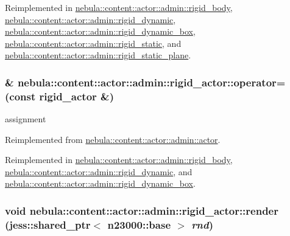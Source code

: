 Reimplemented in \hyperlink{classnebula_1_1content_1_1actor_1_1admin_1_1rigid__body_a549b82effcb63341aa4057712446ce22}{nebula::content::actor::admin::rigid\_\-body}, \hyperlink{classnebula_1_1content_1_1actor_1_1admin_1_1rigid__dynamic_af30bd690cfa2d1a98b1458c658dc97d6}{nebula::content::actor::admin::rigid\_\-dynamic}, \hyperlink{classnebula_1_1content_1_1actor_1_1admin_1_1rigid__dynamic__box_a3d03f28e3ba455be0f39ad66e00c02c9}{nebula::content::actor::admin::rigid\_\-dynamic\_\-box}, \hyperlink{classnebula_1_1content_1_1actor_1_1admin_1_1rigid__static_a12aee11a228e35bd7a8b36ff411387a8}{nebula::content::actor::admin::rigid\_\-static}, and \hyperlink{classnebula_1_1content_1_1actor_1_1admin_1_1rigid__static__plane_a5334403f326a185523ef2c7c380ffa8f}{nebula::content::actor::admin::rigid\_\-static\_\-plane}.\hypertarget{classnebula_1_1content_1_1actor_1_1admin_1_1rigid__actor_a633100102ba359becd477f46159270de}{
\subsubsection[{operator=}]{\& nebula::content::actor::admin::rigid\_\-actor::operator= (const {\bf rigid\_\-actor} \&)}}
\label{classnebula_1_1content_1_1actor_1_1admin_1_1rigid__actor_a633100102ba359becd477f46159270de}


assignment 

Reimplemented from \hyperlink{classnebula_1_1content_1_1actor_1_1admin_1_1actor_a1fa2018d91941548c260422e1b867ba5}{nebula::content::actor::admin::actor}.

Reimplemented in \hyperlink{classnebula_1_1content_1_1actor_1_1admin_1_1rigid__body_a7ed8ba2a35fdf83cf508fe37fde0d875}{nebula::content::actor::admin::rigid\_\-body}, \hyperlink{classnebula_1_1content_1_1actor_1_1admin_1_1rigid__dynamic_accf38f3f07acdbe924c46388230d2e99}{nebula::content::actor::admin::rigid\_\-dynamic}, and \hyperlink{classnebula_1_1content_1_1actor_1_1admin_1_1rigid__dynamic__box_aeed451b7d00e75948f474e4bb20404ba}{nebula::content::actor::admin::rigid\_\-dynamic\_\-box}.\hypertarget{classnebula_1_1content_1_1actor_1_1admin_1_1rigid__actor_a2d1920022481d1e32da69c777ce73541}{
\subsubsection[{render}]{\setlength{\rightskip}{0pt plus 5cm}void nebula::content::actor::admin::rigid\_\-actor::render (jess::shared\_\-ptr$<$ {\bf n23000::base} $>$ {\em rnd})}}
\label{classnebula_1_1content_1_1actor_1_1admin_1_1rigid__actor_a2d1920022481d1e32da69c777ce73541}


